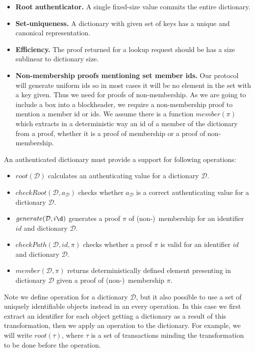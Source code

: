 \documentclass[conference,compsoc]{IEEEtran}
\begin{document}
\begin{itemize}
\item \textbf{Root authenticator.} A single fixed-size value commits the entire dictionary.
\item \textbf{Set-uniqueness.} A dictionary with given set of keys has a unique and canonical representation.
\item \textbf{Efficiency.} The proof returned for a lookup request should be has a size sublinear to dictionary size.
\item \textbf{Non-membership proofs mentioning set member ids.} Our protocol will generate uniform ids so in most cases it will be no element in the set with a key given. Thus we need for proofs of non-membership. As we are going to include a box into a blockheader, we require a non-membership proof to mention a member id or ids. We assume there is a function \(member(\pi)\) which extracts in a deterministic way an id of a member of the dictionary from a proof, whether it is a proof of membership or a proof of non-membership.
\end{itemize}

An authenticated dictionary must provide a support for following operations:

\begin{itemize}
\item{\(root(\mathcal{D})\)} calculates an authenticating value for a dictionary \(\mathcal{D}\).
\item{\(checkRoot(\mathcal{D}, a_\mathcal{D})\)} checks whether \(a_\mathcal{D}\) is a correct authenticating value for a dictionary \(\mathcal{D}\).
\item{\(generate(\mathcal{D}, i\d)\)} generates a proof \(\pi\) of (non-)~membership for an identifier \(id\) and dictionary \(\mathcal{D}\).
\item{\(checkPath(\mathcal{D}, id, \pi)\)} checks whether a proof \(\pi\) is valid for an identifier \(id\) and dictionary \(\mathcal{D}\).
\item{\(member(\mathcal{D}, \pi)\)} returns deterministically defined element presenting in dictionary \(\mathcal{D}\) given a proof of (non-)~membership \(\pi\).
\end{itemize}

Note we define operation for a dictionary \(\mathcal{D}\), but it also possible to use a set of uniquely identifiable objects instead in an every operation. In this case we first extract an identifier for each object getting a dictionary as a result of this transformation, then we apply an operation to the dictionary. For example, we will write \(root(\tau)\), where \(\tau\) is a set of transactions minding the transformation to be done before the operation.
\end{document}
